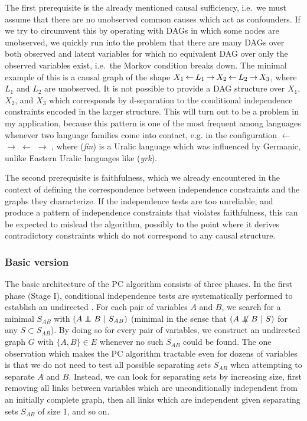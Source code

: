 The first prerequisite is the already mentioned causal sufficiency, i.e.\ we must assume that there are no unobserved common causes which act as confounders. If we try to circumvent this by operating with DAGs in which some nodes are unobserved, we quickly run into the problem that there are many DAGs over both observed and latent variables for which no equivalent DAG over only the observed variables exist, i.e.\ the Markov condition breaks down. The minimal example of this is a causal graph of the shape $X_1 \kern 2pt\hbox{$\leftarrow$}\kern 2pt L_1 \kern 2pt\hbox{$\rightarrow$}\kern 2pt X_2 \kern 2pt\hbox{$\leftarrow$}\kern 2pt L_2 \kern 2pt\hbox{$\rightarrow$}\kern 2pt X_3$, where $L_1$ and $L_2$ are unobserved. It is not possible to provide a DAG structure over $X_1$, $X_2$, and $X_3$ which corresponds by d-separation to the conditional independence constraints encoded in the larger structure. This will turn out to be a problem in my application, because this pattern is one of the most frequent among languages whenever two language families come into contact, e.g. in the configuration  $\leftarrow$  $\rightarrow$  $\leftarrow$  $\rightarrow$ , where  (\textit{fin}) is a Uralic language which was influenced by Germanic, unlike Eastern Uralic languages like  (\textit{yrk}).

The second prerequisite is faithfulness, which we already encountered in the context of defining the correspondence between independence constraints and the graphs they characterize. If the independence tests are too unreliable, and produce a pattern of independence constraints that violates faithfulness, this can be expected to mislead the algorithm, possibly to the point where it derives contradictory constraints which do not correspond to any causal structure.

\subsubsection{Basic version}
The basic architecture of the PC algorithm consists of three phases. In the first phase (Stage I), conditional independence tests are systematically performed to establish an undirected \textit{}. For each pair of variables $A$ and $B$, we search for a minimal \textit{} $S_{AB}$ with $(A \independent B\ |\ S_{AB})$ (minimal in the sense that $(A \notindep B\ |\ S)$ for any $S \subset S_{AB}$). By doing so for every pair of variables, we construct an undirected graph $G$ with $\{A,B\} \in E$ whenever no such $S_{AB}$ could be found. The one observation which makes the PC algorithm tractable even for dozens of variables is that we do not need to test all possible separating sets $S_{AB}$ when attempting to separate $A$ and $B$. Instead, we can look for separating sets by increasing size, first removing all links between variables which are unconditionally independent from an initially complete graph, then all links which are independent given separating sets $S_{AB}$ of size 1, and so on.

